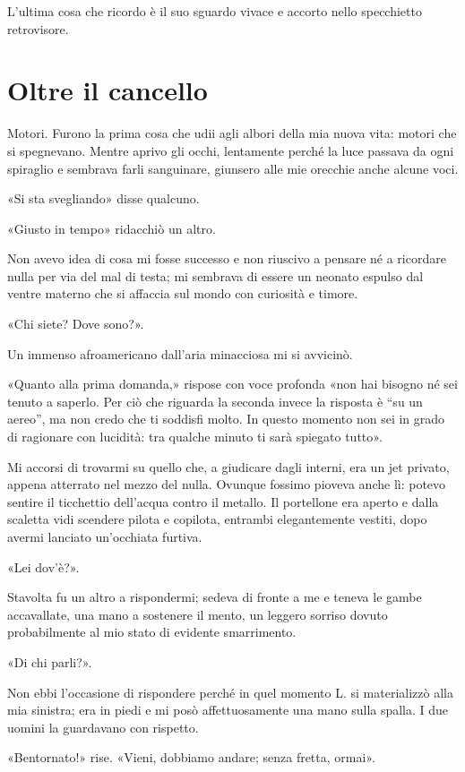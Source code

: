\documentclass[a4paper,10pt]{memoir}
\begin{document}
L'ultima cosa che ricordo è il suo sguardo vivace e accorto nello specchietto retrovisore.

\chapter{Oltre il cancello}

Motori. Furono la prima cosa che udii agli albori della mia nuova vita: motori
che si spegnevano. Mentre aprivo gli occhi, lentamente perché la luce passava
da ogni spiraglio e sembrava farli sanguinare, giunsero alle mie orecchie anche
alcune voci.

«Si sta svegliando» disse qualcuno.

«Giusto in tempo» ridacchiò un altro.

Non avevo idea di cosa mi fosse successo e non riuscivo a pensare né a ricordare
nulla per via del mal di testa; mi sembrava di essere un neonato espulso dal
ventre materno che si affaccia sul mondo con curiosità e timore.

«Chi siete? Dove sono?».

Un immenso afroamericano dall'aria minacciosa mi si avvicinò.

«Quanto alla prima domanda,» rispose con voce profonda «non hai bisogno né sei tenuto a saperlo. Per ciò che riguarda la
seconda invece la risposta è ``su un aereo'', ma non credo che ti soddisfi molto. In questo momento non sei in grado di
ragionare con lucidità: tra qualche minuto ti sarà spiegato tutto».

Mi accorsi di trovarmi su quello che, a giudicare dagli interni, era un jet privato, appena atterrato nel mezzo del
nulla. Ovunque fossimo pioveva anche lì: potevo sentire il ticchettio dell'acqua contro il metallo. Il portellone era
aperto e dalla scaletta vidi scendere pilota e copilota, entrambi elegantemente vestiti, dopo avermi lanciato
un'occhiata furtiva.

«Lei dov'è?».

Stavolta fu un altro a rispondermi; sedeva di fronte a me e teneva le gambe accavallate, una mano a sostenere il mento,
un leggero sorriso dovuto probabilmente al mio stato di evidente smarrimento.

«Di chi parli?».

Non ebbi l'occasione di rispondere perché in quel momento L. si materializzò alla mia sinistra; era in piedi e mi posò
affettuosamente una mano sulla spalla. I due uomini la guardavano con rispetto.

«Bentornato!» rise. «Vieni, dobbiamo andare; senza fretta, ormai».
\end{document}

